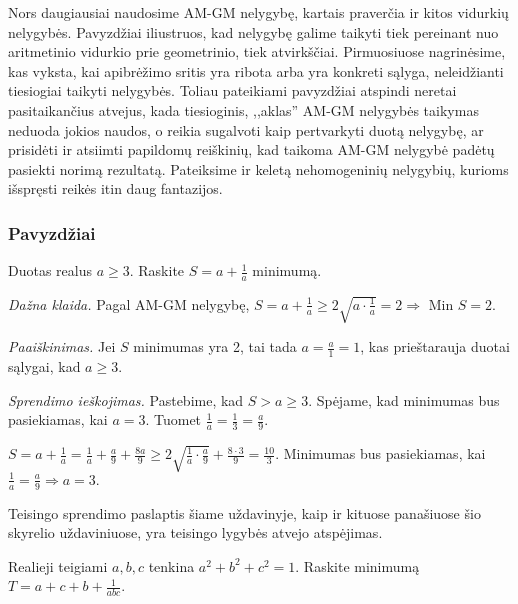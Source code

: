 Nors daugiausiai naudosime AM-GM nelygybę, kartais praverčia ir kitos
vidurkių nelygybės. Pavyzdžiai iliustruos, kad nelygybę galime taikyti tiek
pereinant nuo aritmetinio vidurkio prie geometrinio, tiek atvirkščiai.
Pirmuosiuose nagrinėsime, kas vyksta, kai apibrėžimo sritis yra ribota arba
yra konkreti sąlyga, neleidžianti tiesiogiai taikyti nelygybės. Toliau
pateikiami pavyzdžiai atspindi neretai pasitaikančius atvejus, kada
tiesioginis, ,,aklas'' AM-GM nelygybės taikymas neduoda jokios naudos, o
reikia sugalvoti kaip pertvarkyti duotą nelygybę, ar prisidėti ir atsiimti
papildomų reiškinių, kad taikoma AM-GM nelygybė padėtų pasiekti norimą
rezultatą. Pateiksime ir keletą nehomogeninių nelygybių, kurioms išspręsti
reikės itin daug fantazijos.

\subsubsection{Pavyzdžiai}

\begin{pavnr}
  Duotas realus $a \geq 3$. Raskite $S=a+\frac{1}{a}$ minimumą.
\end{pavnr}

\noindent \textit{Dažna klaida.} Pagal AM-GM nelygybę, $S=a+\frac{1}{a}\geq
2\sqrt{a\cdot\frac{1}{a}}=2 \Rightarrow$ Min $S=2$.

\noindent \textit{Paaiškinimas.} Jei $S$ minimumas yra 2, tai tada
$a=\frac{a}{1}=1$, kas prieštarauja duotai sąlygai, kad $a\geq3$.

\noindent \textit{Sprendimo ieškojimas.} Pastebime, kad $S > a \geq 3$.
Spėjame, kad minimumas bus pasiekiamas, kai $a=3$. Tuomet
$\frac{1}{a}=\frac{1}{3}=\frac{a}{9}$.

\begin{sprendimas}
  $S=a+\frac{1}{a}=\frac{1}{a}+ \frac{a}{9}+\frac{8a}{9}\geq
  2\sqrt{\frac{1}{a}\cdot\frac{a}{9}}+\frac{8 \cdot 3}{9}=\frac{10}{3} $.
  Minimumas bus pasiekiamas, kai $\frac{1}{a}=\frac{a}{9} \Rightarrow a=3. $
\end{sprendimas}

\begin{pastaba}
  Teisingo sprendimo paslaptis šiame uždavinyje, kaip ir kituose panašiuose
  šio skyrelio uždaviniuose, yra teisingo lygybės atvejo atspėjimas.
\end{pastaba}

\begin{pavnr}[Macedonia 1999]
  Realieji teigiami $a,b,c$ tenkina $a^2+b^2+c^2=1$. Raskite minimumą
  $T=a+c+b+\frac{1}{abc}$.
\end{pavnr}

